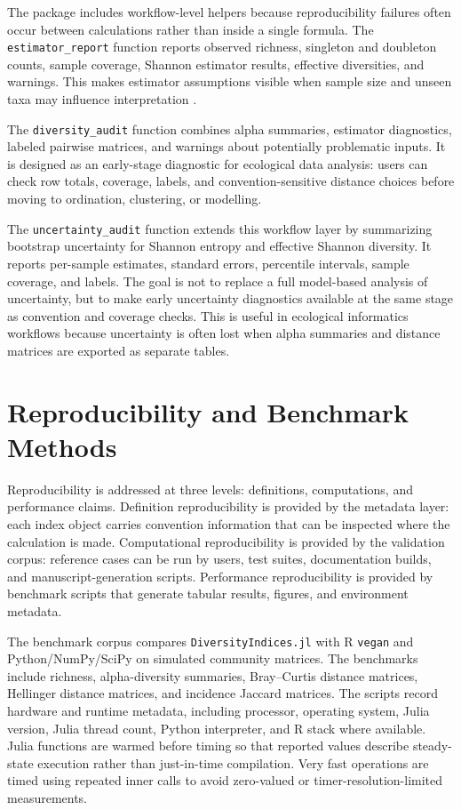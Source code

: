 \documentclass[preprint,12pt,authoryear]{elsarticle}
\begin{document}
The package includes workflow-level helpers because reproducibility failures
often occur between calculations rather than inside a single formula.  The
\texttt{estimator\_report} function reports observed richness, singleton and
doubleton counts, sample coverage, Shannon estimator results, effective
diversities, and warnings.  This makes estimator assumptions visible when
sample size and unseen taxa may influence interpretation
\citep{chao2003nonparametric}.

The \texttt{diversity\_audit} function combines alpha summaries, estimator
diagnostics, labeled pairwise matrices, and warnings about potentially
problematic inputs.  It is designed as an early-stage diagnostic for ecological
data analysis: users can check row totals, coverage, labels, and
convention-sensitive distance choices before moving to ordination, clustering,
or modelling.

The \texttt{uncertainty\_audit} function extends this workflow layer by
summarizing bootstrap uncertainty for Shannon entropy and effective Shannon
diversity.  It reports per-sample estimates, standard errors, percentile
intervals, sample coverage, and labels.  The goal is not to replace a full
model-based analysis of uncertainty, but to make early uncertainty diagnostics
available at the same stage as convention and coverage checks.  This is useful
in ecological informatics workflows because uncertainty is often lost when
alpha summaries and distance matrices are exported as separate tables.

\section{Reproducibility and Benchmark Methods}

Reproducibility is addressed at three levels: definitions, computations, and
performance claims.  Definition reproducibility is provided by the metadata
layer: each index object carries convention information that can be inspected
where the calculation is made.  Computational reproducibility is provided by
the validation corpus: reference cases can be run by users, test suites,
documentation builds, and manuscript-generation scripts.  Performance
reproducibility is provided by benchmark scripts that generate tabular
results, figures, and environment metadata.

The benchmark corpus compares \texttt{DiversityIndices.jl} with R
\texttt{vegan} and Python/NumPy/SciPy on simulated community matrices.  The
benchmarks include richness, alpha-diversity summaries, Bray--Curtis distance
matrices, Hellinger distance matrices, and incidence Jaccard matrices.  The
scripts record hardware and runtime metadata, including processor, operating
system, Julia version, Julia thread count, Python interpreter, and R stack
where available.  Julia functions are warmed before timing so that reported
values describe steady-state execution rather than just-in-time compilation.
Very fast operations are timed using repeated inner calls to avoid
zero-valued or timer-resolution-limited measurements.
\end{document}
